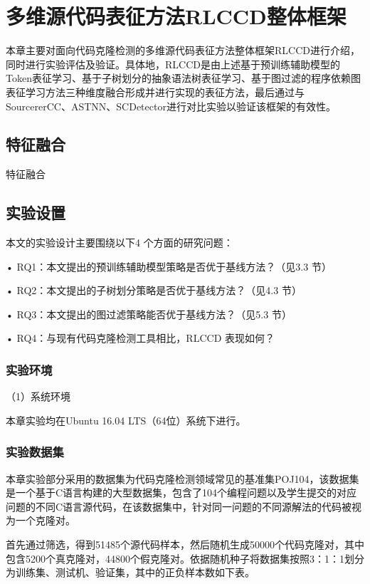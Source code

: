 \chapter{多维源代码表征方法RLCCD整体框架}
本章主要对面向代码克隆检测的多维源代码表征方法整体框架RLCCD进行介绍，同时进行实验评估及验证。具体地，RLCCD是由上述基于预训练辅助模型的Token表征学习、基于子树划分的抽象语法树表征学习、基于图过滤的程序依赖图表征学习方法三种维度融合形成并进行实现的表征方法，最后通过与SourcererCC、ASTNN、SCDetector进行对比实验以验证该框架的有效性。
\section{特征融合}
特征融合
\section{实验设置}
本文的实验设计主要围绕以下4 个方面的研究问题：

• RQ1：本文提出的预训练辅助模型策略是否优于基线方法？（见3.3 节）

• RQ2：本文提出的子树划分策略是否优于基线方法？（见4.3 节）

• RQ3：本文提出的图过滤策略能否优于基线方法？（见5.3 节）

• RQ4：与现有代码克隆检测工具相比，RLCCD 表现如何？

\subsection{实验环境}
（1）系统环境

本章实验均在Ubuntu 16.04 LTS（64位）系统下进行。


\subsection{实验数据集}
本章实验部分采用的数据集为代码克隆检测领域常见的基准集POJ104，该数据集是一个基于C语言构建的大型数据集，包含了104个编程问题以及学生提交的对应问题的不同C语言源代码，在该数据集中，针对同一问题的不同源解法的代码被视为一个克隆对。

首先通过筛选，得到51485个源代码样本，然后随机生成50000个代码克隆对，其中包含5200个真克隆对，44800个假克隆对。依据随机种子将数据集按照3：1：1划分为训练集、测试机、验证集，其中的正负样本数如下表。



